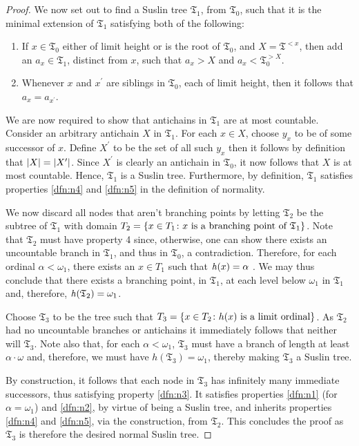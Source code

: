 \begin{proof}
	We now set out to find a Suslin tree $\mathfrak{T}_1$, from
	$\mathfrak{T}_0$, such that it is the minimal extension of
	$\mathfrak{T}_{1}$ satisfying both of the following:
	\begin{enumerate}
		\item If $x\in\mathfrak{T}_{0}$ either of limit height or is the root of
		      $\mathfrak{T}_{0}$, and $X=\mathfrak{T}^{<x}$, then add an
		      $a_{x}\in\mathfrak{T}_{1}$, distinct from $x$, such that $a_{x}>X$ and
		      $a_{x}<\mathfrak{T}_{0}^{>X}$.
		\item Whenever $x$ and $x^{\prime}$ are siblings in $\mathfrak{T}_{0}$,
		      each of limit height, then it follows that $a_{x}=a_{x^{\prime}}$.
	\end{enumerate}

	We are now required to show that antichains in $\mathfrak{T}_1$ are at most
	countable.  Consider an arbitrary antichain $X$ in $\mathfrak{T}_1$.  For each $x\in X$,
	choose $y_{x}$ to be of some successor of $x$.  Define $X^{\prime}$
	to be the set of all such $y_{x}$ then it follows by definition that
	$\left\lvert X\right\rvert=\left\lvert X^{\prime}\right\rvert$. Since $X^{\prime}$ is clearly an antichain in
	$\mathfrak{T}_{0}$, it now follows that $X$ is at most countable.  Hence,
	$\mathfrak{T}_{1}$ is a Suslin tree. Furthermore, by definition,
	$\mathfrak{T}_1$ satisfies properties \ref{dfn:n4} and \ref{dfn:n5} in the
	definition of normality.

	We now discard all nodes that aren't branching points by letting
	$\mathfrak{T}_2$ be the subtree of $\mathfrak{T}_{1}$ with domain
	$T_2=\left\lbrace x\in T_1\colon x\text{ is a branching point of }\mathfrak{T}_1 \right\rbrace$.
	Note that $\mathfrak{T}_{2}$ must have property 4 since, otherwise, one can
	show there exists an uncountable branch in $\mathfrak{T}_{1}$, and thus in
	$\mathfrak{T}_{0}$, a contradiction. Therefore, for each ordinal
	$\alpha<\omega_{1}$, there exists an $x\in T_1$ such that $\mathit{h}(x)=\alpha$ .
	We may thus conclude that there exists a branching point, in $\mathfrak{T}_{1}$,
	at each level below $\omega_1$ in $\mathfrak{T}_1$ and, therefore,
	$\mathit{h}(\mathfrak{T}_2)=\omega_1$.

	Choose $\mathfrak{T}_3$ to be the tree such that
	$T_3=\left\lbrace x\in T_2\colon h(x)\text{ is a limit ordinal} \right\rbrace$. As $\mathfrak{T}_2$
	had no uncountable branches or antichains it immediately follows that neither
	will $\mathfrak{T}_3$.  Note also that, for each $\alpha<\omega_{1}$,
	$\mathfrak{T}_{3}$ must have a branch of length at least $\alpha\cdot\omega$ and,
	therefore, we must have $h(\mathfrak{T}_{3})=\omega_{1}$, thereby making
	$\mathfrak{T}_3$ a Suslin tree.

	By construction, it follows that each node in $\mathfrak{T}_3$ has
	infinitely many immediate successors, thus satisfying property \ref{dfn:n3}.
	It satisfies properties \ref{dfn:n1} (for $\alpha=\omega_1$) and \ref{dfn:n2},
	by virtue of being a Suslin tree, and inherits properties \ref{dfn:n4} and
	\ref{dfn:n5}, via the construction, from $\mathfrak{T}_2$.  This concludes the proof as $\mathfrak{T}_3$ is therefore the desired normal Suslin tree.
\end{proof}

